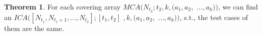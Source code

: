 \documentclass[conference]{IEEEtran}
\theoremstyle{definition}
\newtheorem*{theorem}{Theorem}
\begin{document}
%
%
%
%


\begin{theorem}
For each covering array $MCA(N_{t_{2}}; t_{2}, k, (a_{1},a_{2},$ $...,a_{k}))$, we can find an $ICA([N_{t_{1}},N_{t_{1} + 1},...,N_{t_{2}}];[t_{1},t_{2}]$ $, k, (a_{1},a_{2},$ $...,a_{k}))$, s.t., the test cases of them are the same.
\end{theorem}
\end{document}
